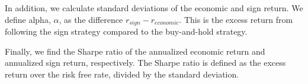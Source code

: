 In addition, we calculate standard deviations of the economic and sign return. We define alpha, $\alpha$, as the difference $r_{sign}-r_{economic}$. This is the excess return from following the sign strategy compared to the buy-and-hold strategy. 

Finally, we find the Sharpe ratio of the annualized economic return and annualized sign return, respectively. The Sharpe ratio is defined as the excess return over the risk free rate, divided by the standard deviation.

